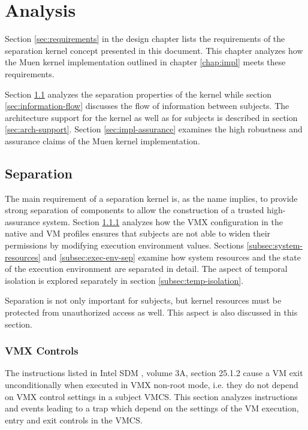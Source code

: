 \chapter{Analysis}
Section \ref{sec:requirements} in the design chapter lists the requirements of
the separation kernel concept presented in this document. This chapter analyzes
how the Muen kernel implementation outlined in chapter \ref{chap:impl} meets
these requirements.

Section \ref{sec:separation} analyzes the separation properties of the kernel
while section \ref{sec:information-flow} discusses the flow of information
between subjects. The architecture support for the kernel as well as for
subjects is described in section \ref{sec:arch-support}. Section
\ref{sec:impl-assurance} examines the high robustness and assurance claims of
the Muen kernel implementation.

\section{Separation}\label{sec:separation}
The main requirement of a separation kernel is, as the name implies, to provide
strong separation of components to allow the construction of a trusted
high-assurance system. Section \ref{subsec:vmx-controls} analyzes how the VMX
configuration in the native and VM profiles ensures that subjects are not able
to widen their permissions by modifying execution environment values. Sections
\ref{subsec:system-resources} and \ref{subsec:exec-env-sep} examine how system
resources and the state of the execution environment are separated in detail.
The aspect of temporal isolation is explored separately in section
\ref{subsec:temp-isolation}.

Separation is not only important for subjects, but kernel resources must be
protected from unauthorized access as well. This aspect is also discussed in
this section.

\subsection{VMX Controls}\label{subsec:vmx-controls}
The instructions listed in Intel SDM \cite{IntelSDM}, volume 3A, section 25.1.2
cause a VM exit unconditionally when executed in VMX non-root mode, i.e. they
do not depend on VMX control settings in a subject VMCS. This section analyzes
instructions and events leading to a trap which depend on the settings of the
VM execution, entry and exit controls in the VMCS.

